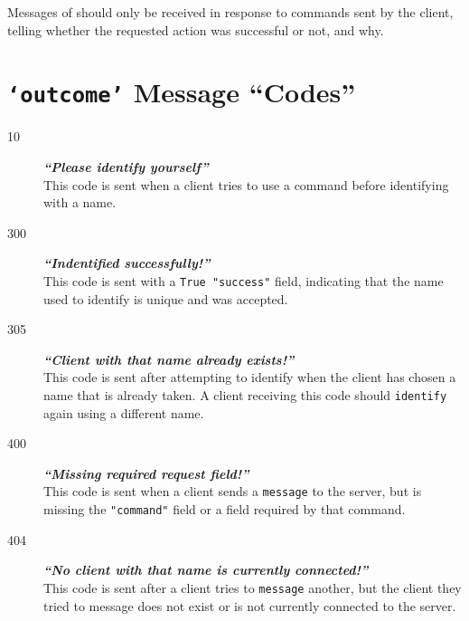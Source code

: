 \documentclass[12pt,letterpaper]{article}
\begin{document}
Messages of \outcome  should only be received in response to commands sent by the client, telling whether the requested action was successful or not, and why.


\section{\texttt{`outcome'} Message ``Codes''}
\begin{description}
  \item[10] \textbf{\textit{``Please identify yourself''}} \\
    This code is sent when a client tries to use a command before identifying with a name.
  \item[300] \textbf{\textit{``Indentified successfully!''}} \\
    This code is sent with a \texttt{True "success"} field, indicating that the name used to identify is unique and was accepted.
  \item[305] \textbf{\textit{``Client with that name already exists!''}} \\
    This code is sent after attempting to identify when the client has chosen a name that is already taken. A client receiving this code should \texttt{identify} again using a different name.
  \item[400] \textbf{\textit{``Missing required request field!''}} \\
    This code is sent when a client sends a \texttt{message} to the server, but is missing the \texttt{"command"} field or a field required by that command.
  \item[404] \textbf{\textit{``No client with that name is currently connected!''}} \\
    This code is sent after a client tries to \texttt{message} another, but the client they tried to message does not exist or is not currently connected to the server.
\end{description}
\end{document}
